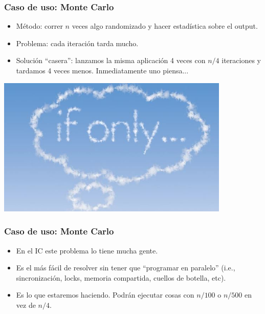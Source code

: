 \documentclass[handout]{beamer}
\begin{document}
\begin{frame}
\frametitle{Caso de uso: Monte Carlo}
\begin{itemize}
  \item<+-> Método: correr $n$ veces algo randomizado y hacer estadística sobre el output.
  \item<+-> Problema: cada iteración tarda mucho.
  \item<+-> Solución ``casera'': lanzamos la misma aplicación 4 veces con $n/4$ iteraciones y tardamos 4 veces menos. Inmediatamente uno piensa...
\end{itemize}
\end{frame}

\begin{frame}
\begin{center}
\includegraphics[width=30em]{ifonly.jpg}
\end{center}
\end{frame}


\begin{frame}
\frametitle{Caso de uso: Monte Carlo}
\begin{itemize}
  \item En el IC este problema lo tiene mucha gente.
  \item Es el más fácil de resolver sin tener que ``programar en paralelo'' (i.e., sincronización, locks, memoria compartida, cuellos de botella, etc).
  \item Es lo que estaremos haciendo. Podrán ejecutar cosas con $n/100$ o $n/500$ en vez de $n/4$. 
\end{itemize}
\end{frame}
\end{document}
